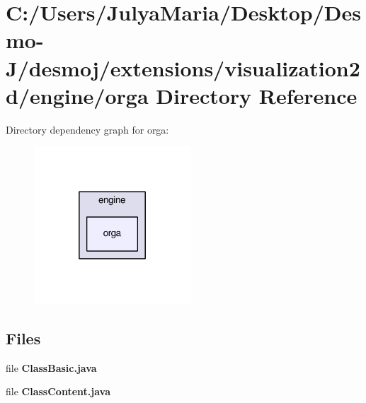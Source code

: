 \section{C\-:/\-Users/\-Julya\-Maria/\-Desktop/\-Desmo-\/\-J/desmoj/extensions/visualization2d/engine/orga Directory Reference}
\label{dir_8021a15fe2f44a8cca6d66b5548cea47}
Directory dependency graph for orga\-:
\nopagebreak
\begin{figure}[H]
\begin{center}
\leavevmode
\includegraphics[width=166pt]{dir_8021a15fe2f44a8cca6d66b5548cea47_dep}
\end{center}
\end{figure}
\subsection*{Files}
\begin{DoxyCompactItemize}
\item 
file {\bfseries Class\-Basic.\-java}
\item 
file {\bfseries Class\-Content.\-java}
\end{DoxyCompactItemize}
